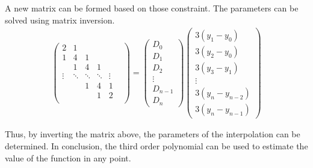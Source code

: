 \begin{appendices}
A new matrix can be formed based on those constraint. The parameters can be solved using matrix inversion. 
\begin{align}
  \begin{pmatrix}
    2&1& & & &\\
    1&4&1& & &\\
     &1&4&1& &\\
     \vdots&\ddots&\ddots&\ddots&\vdots& \\
     & &1&4&1&\\
     & & &1&2&\\
  \end{pmatrix}
    =
\begin{pmatrix}
    D_{0}\\
    D_{1}\\
    D_{2} \\
    \vdots \\
    D_{n-1} \\
    D_{n}
\end{pmatrix}
\begin{pmatrix}
    3(y_1-y_0)\\
    3(y_2-y_0)\\
    3(y_3-y_1)\\
    \vdots \\
    3(y_n-y_{n-2})\\
    3(y_n-y_{n-1})
   \end{pmatrix}
\end{align}
\end{appendices}
Thus, by inverting the matrix above, the parameters of the interpolation can be determined. In conclusion, the third order polynomial can be used to estimate the value of the function in any point. 
